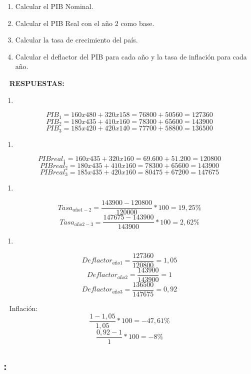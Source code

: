\documentclass[
  letterpaper,
  DIV=11,
  numbers=noendperiod]{scrreport}
\providecommand{\tightlist}{%
  \setlength{\itemsep}{0pt}\setlength{\parskip}{0pt}}\usepackage{longtable,booktabs,array}
\begin{document}
\begin{enumerate}
\def\labelenumi{\alph{enumi})}
\item
  Calcular el PIB Nominal.
\item
  Calcular el PIB Real con el año 2 como base.
\item
  Calcular la tasa de crecimiento del país.
\item
  Calcular el deflactor del PIB para cada año y la tasa de inflación
  para cada año.
\end{enumerate}

~ \textbf{RESPUESTAS:}

\begin{enumerate}
\def\labelenumi{\alph{enumi})}
\tightlist
\item
\end{enumerate}

\[PIB_{1}= 160x480+320x158= 76800+ 50560= 127360\]
\[PIB_{2}= 180x435+410x160= 78300+65600= 143900\]
\[PIB_{3}= 185x420+420x140= 77700+58800= 136500\]

\begin{enumerate}
\def\labelenumi{\alph{enumi})}
\setcounter{enumi}{1}
\tightlist
\item
\end{enumerate}

\[PIBreal_{1}= 160x435+320x160= 69.600+51.200= 120800 \]
\[PIBreal_{2}= 180x435+410x160= 78300+65600= 143900 \]
\[PIBreal_{3}= 185x435+420x160= 80475+ 67200= 147675 \]

\begin{enumerate}
\def\labelenumi{\alph{enumi})}
\setcounter{enumi}{2}
\tightlist
\item
\end{enumerate}

\[Tasa_{año1-2}=\frac{143900 − 120800}{120000}*100 = 19,25 \% \]
\[Tasa_{año2-3}=\frac{147675 − 143900}{143900}*100 = 2,62\% \]

\begin{enumerate}
\def\labelenumi{\alph{enumi})}
\setcounter{enumi}{3}
\tightlist
\item
\end{enumerate}

\[Deflactor_{año1} = \frac{127360}{120800}=1,05\]
\[Deflactor_{año2} = \frac{143900}{143900}=1\]
\[Deflactor_{año3} = \frac{136500}{147675}=0,92\]

~ Inflación: \[\frac{1 - 1,05}{1,05}*100 = -47,61\%\]
\[\frac{0,92 - 1}{1}*100 = -8 \%\]

\hypertarget{section-28}{%
\subsection{:}\label{section-28}}
\end{document}
